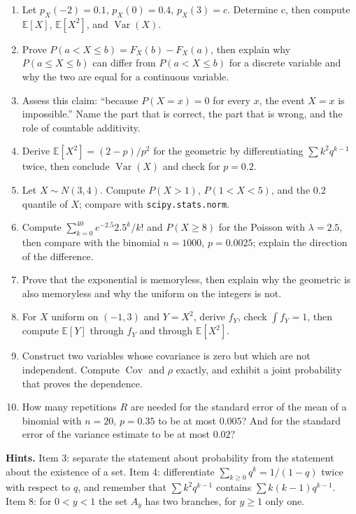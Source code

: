 \begin{latihan}
\begin{enumerate}
  \item Let $p_X(-2)=0.1$, $p_X(0)=0.4$, $p_X(3)=c$. Determine $c$, then
        compute $\mathbb{E}[X]$, $\mathbb{E}[X^2]$, and $\operatorname{Var}(X)$.
  \item Prove $P(a<X\le b)=F_X(b)-F_X(a)$, then explain why
        $P(a\le X\le b)$ can differ from $P(a<X\le b)$ for a discrete variable and
        why the two are equal for a continuous variable.
  \item Assess this claim: ``because $P(X=x)=0$ for every $x$, the event $X=x$
        is impossible.'' Name the part that is correct, the part that is wrong, and the role of countable
        additivity.
  \item Derive $\mathbb{E}[X^2]=(2-p)/p^2$ for the geometric by differentiating
        $\sum k^2q^{k-1}$ twice, then conclude $\operatorname{Var}(X)$ and check
        for $p=0.2$.
  \item Let $X\sim N(3,4)$. Compute $P(X>1)$, $P(1<X<5)$, and the 0.2 quantile of
        $X$; compare with \texttt{scipy.stats.norm}.
  \item Compute $\sum_{k=0}^{40}e^{-2.5}2.5^k/k!$ and $P(X\ge8)$ for the Poisson
        with $\lambda=2.5$, then compare with the binomial $n=1000$, $p=0.0025$;
        explain the direction of the difference.
  \item Prove that the exponential is memoryless, then explain why the geometric is also
        memoryless and why the uniform on the integers is not.
  \item For $X$ uniform on $(-1,3)$ and $Y=X^2$, derive $f_Y$, check
        $\int f_Y=1$, then compute $\mathbb{E}[Y]$ through $f_Y$ and through
        $\mathbb{E}[X^2]$.
  \item Construct two variables whose covariance is zero but which are not independent. Compute
        $\operatorname{Cov}$ and $\rho$ exactly, and exhibit a joint probability
        that proves the dependence.
  \item How many repetitions $R$ are needed for the standard error of the mean of a binomial with $n=20$, $p=0.35$
        to be at most $0.005$? And for the standard error of the variance estimate to be at
        most $0.02$?
\end{enumerate}

\noindent\textbf{Hints.} Item 3: separate the statement about probability from the
statement about the existence of a set. Item 4: differentiate $\sum_{k\ge0}q^k=1/(1-q)$
twice with respect to $q$, and remember that $\sum k^2q^{k-1}$ contains $\sum k(k-1)q^{k-1}$.
Item 8: for $0<y<1$ the set $A_y$ has two branches, for $y\ge1$ only one.
\end{latihan}

